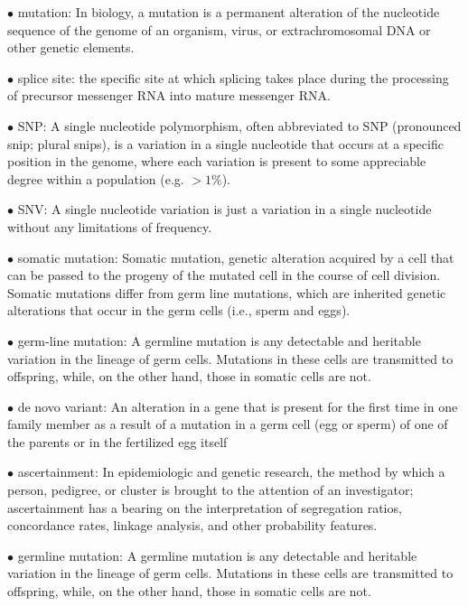 \documentclass{article}
\begin{document}
\vspace{0.1in}
$\bullet$ mutation:
In biology, a mutation is a permanent alteration of the nucleotide sequence of the genome of an organism, virus, or extrachromosomal DNA or other genetic elements.


\vspace{0.1in}
$\bullet$ splice site:
the specific site at which splicing takes place during the processing of precursor messenger RNA into mature messenger RNA.


\vspace{0.1in}
$\bullet$ SNP:
A single nucleotide polymorphism, often abbreviated to SNP (pronounced snip; plural snips), is a variation in a single nucleotide that occurs at a specific position in the genome, where each variation is present to some appreciable degree within a population (e.g. $ >1\% $).


\vspace{0.1in}
$\bullet$ SNV:
A single nucleotide variation is just a variation in a single nucleotide without any limitations of frequency. 


\vspace{0.1in}
$\bullet$ somatic mutation:
Somatic mutation, genetic alteration acquired by a cell that can be passed to the progeny of the mutated cell in the course of cell division. Somatic mutations differ from germ line mutations, which are inherited genetic alterations that occur in the germ cells (i.e., sperm and eggs).


\vspace{0.1in}
$\bullet$ germ-line mutation:
A germline mutation is any detectable and heritable variation in the lineage of germ cells. Mutations in these cells are transmitted to offspring, while, on the other hand, those in somatic cells are not.


\vspace{0.1in}
$\bullet$ de novo variant:
An alteration in a gene that is present for the first time in one family member as a result of a mutation in a germ cell (egg or sperm) of one of the parents or in the fertilized egg itself


\vspace{0.1in}
$\bullet$ ascertainment:
In epidemiologic and genetic research, the method by which a person, pedigree, or cluster is brought to the attention of an investigator; ascertainment has a bearing on the interpretation of segregation ratios, concordance rates, linkage analysis, and other probability features.


\vspace{0.1in}
$\bullet$ germline mutation:
A germline mutation is any detectable and heritable variation in the lineage of germ cells. Mutations in these cells are transmitted to offspring, while, on the other hand, those in somatic cells are not.
\end{document}
